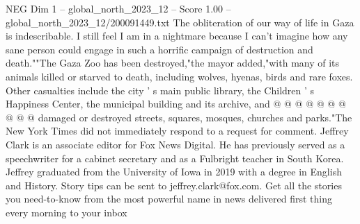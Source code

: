 \begin{textsample}{NEG Dim 1 – global\_north\_2023\_12 – Score 1.00 – global\_north\_2023\_12/200091449.txt}
The obliteration of our way of life in Gaza is indescribable.
I still feel I am in a nightmare because I can't imagine how any sane person could engage in such a horrific campaign of destruction and death.""The Gaza Zoo has been destroyed,"the mayor added,"with many of its animals killed or starved to death, including wolves, hyenas, birds and rare foxes.
Other casualties include the city ' s main public library, the Children ' s Happiness Center, the municipal building and its archive, and @ @ @ @ @ @ @ @ @ @ damaged or destroyed streets, squares, mosques, churches and parks."The New York Times did not immediately respond to a request for comment.
Jeffrey Clark is an associate editor for Fox News Digital.
He has previously served as a speechwriter for a cabinet secretary and as a Fulbright teacher in South Korea.
Jeffrey graduated from the University of Iowa in 2019 with a degree in English and History.
Story tips can be sent to jeffrey.clark@fox.com.
Get all the stories you need-to-know from the most powerful name in news delivered first thing every morning to your inbox

\end{textsample}

